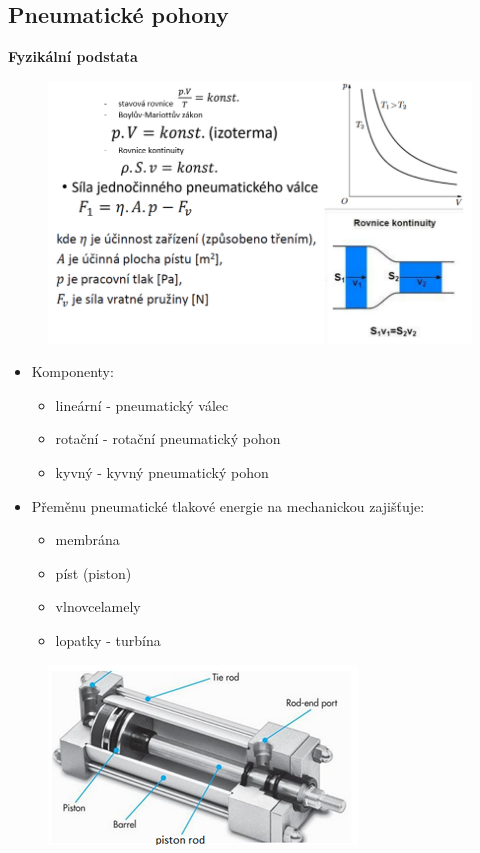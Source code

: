 \subsection{Pneumatické pohony}
\textbf{Fyzikální podstata}

\begin{figure}[h]
  \begin{center}
    \includegraphics[scale = 0.7]{img/Picture12.png}
  \end{center}
\end{figure}

\begin{itemize}
  \item Komponenty: \begin{itemize}
    \item lineární - pneumatický válec
    \item rotační - rotační pneumatický pohon
    \item kyvný - kyvný pneumatický pohon
  \end{itemize}
  \item Přeměnu pneumatické tlakové energie na mechanickou zajišťuje: \begin{itemize}
    \item membrána
    \item píst (piston)
    \item vlnovcelamely
    \item lopatky - turbína
  \end{itemize}
\end{itemize}

\begin{figure}[h]
  \begin{center}
    \includegraphics[scale = 1]{img/Picture10.png}
  \end{center}
\end{figure}

